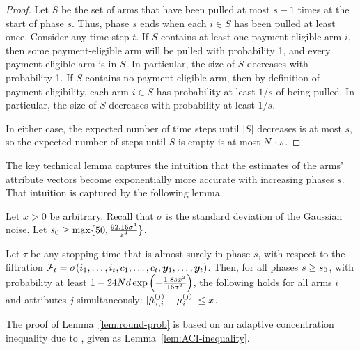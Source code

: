 \begin{proof}
Let $S$ be the set of arms that have been pulled at most
$s-1$ times at the start of phase $s$.
Thus, phase $s$ ends when each $i \in S$ has been pulled at least once.
Consider any time step $t$.
If $S$ contains at least one payment-eligible arm $i$,
then some payment-eligible arm will be pulled with probability 1,
and every payment-eligible arm is in $S$.
In particular, the size of $S$ decreases with probability 1.
If $S$ contains no payment-eligible arm,
then by definition of payment-eligibility,
each arm $i \in S$ has probability at least $1/s$ of being pulled.
In particular, the size of $S$ decreases with probability at least $1/s$.

In either case, the expected number of time steps until
$|S|$ decreases is at most $s$,
so the expected number of steps until $S$ is empty is at most
$N \cdot s$.
\end{proof}
                  
The key technical lemma captures the intuition that
the estimates of the arms' attribute vectors become
exponentially more accurate with increasing phases $s$.
That intuition is captured by the following lemma.

\begin{lemma} \label{lem:round-prob}
Let $x > 0$ be arbitrary.
Recall that $\sigma$ is the standard deviation of the Gaussian noise.
Let $s_0 \geq \max \{ 50, \frac{92.16 \sigma^4}{x^4} \}$.

Let $\tau$ be any stopping time that is almost surely  in phase $s$,
with respect to the filtration
$\mathcal{F}_{t} = \sigma (i_{1}, \ldots, i_{t},
                          c_{1}, \ldots, c_{t},
                          \bm{y}_{1}, \ldots, \bm{y}_{t})$.
Then, for all phases $s \geq s_0$,
with probability at least 
$1- 24 N d \exp\left(-\frac{1.8 s x^2}{16 \sigma^2} \right)$,
the following holds for all arms $i$ and attributes $j$
simultaneously:
$|\hat{\mu}_{\tau,i}^{(j)} - \mu_{i}^{(j)}| \leq x$.
\end{lemma}

The proof of Lemma~\ref{lem:round-prob} is based on an adaptive
concentration inequality due to \cite{zhao2016adaptive},
given as Lemma~\ref{lem:ACI-inequality}.

